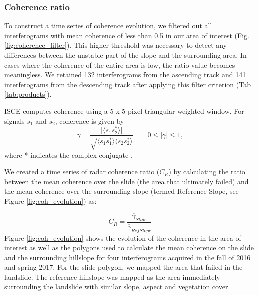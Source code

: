 \documentclass[nhess, manuscript]{copernicus}
\begin{document}
\subsubsection{Coherence ratio}
 \label{sec:coh}
To construct a time series of coherence evolution, we filtered out all interferograms with mean coherence of less than 0.5 in our area of interest (Fig. \ref{fig:coherence_filter}). This higher threshold was necessary to detect any differences between the unstable part of the slope and the surrounding area. In cases where the coherence of the entire area is low, the ratio value becomes meaningless. We retained 132 interferograms from the ascending track and 141 interferograms from the descending track after applying this filter criterion (Tab \ref{tab:products}).\par 
ISCE computes coherence using a 5 x 5 pixel triangular weighted window. For signals $s_1$ and $s_2$, coherence is given by
\begin{equation}
    \gamma = \frac{\lvert \langle s_1 s^*_2\rangle\rvert}{\sqrt{\langle s_1 s^*_1\rangle \langle s_2 s^*_2\rangle}}\qquad 0\leq | \gamma | \leq 1,
\end{equation}
where * indicates the complex conjugate \citep{jung2016}.\par
We created a time series of radar coherence ratio ($C_R$) by calculating the ratio between the mean coherence over the slide (the area that ultimately failed) and the mean coherence over the surrounding slope (termed Reference Slope, see Figure \ref{fig:coh_evolution}) as:\par
\begin{equation}
    C_R=\frac{\overline{\gamma}_{Slide}}{\overline{\gamma}_{RefSlope}}
\end{equation}
Figure \ref{fig:coh_evolution} shows the evolution of the coherence in the area of interest as well as the polygons used to calculate the mean coherence on the slide and the surrounding hillslope for four interferograms acquired in the fall of 2016 and spring 2017. For the slide polygon, we mapped the area that failed in the landslide. The reference hillslope was mapped as the area immediately surrounding the landslide with similar slope, aspect and vegetation cover. \par
\end{document}
